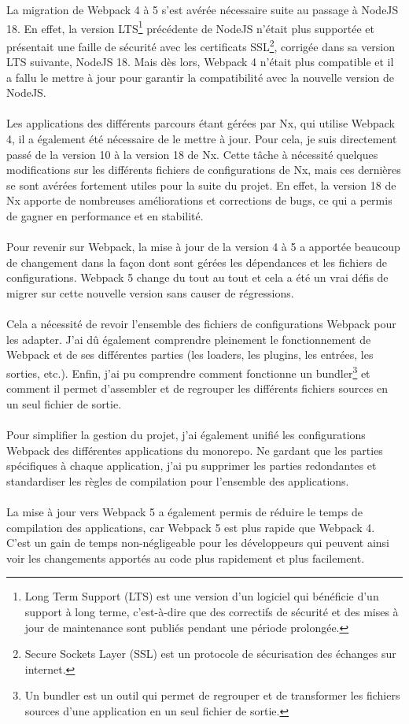 \documentclass[12pt, a4paper]{report}
\begin{document}
	La migration de Webpack 4 à 5 s'est avérée nécessaire suite au passage à NodeJS 18. En effet, la version LTS\footnote{Long Term Support (LTS) est une version d'un logiciel qui bénéficie d'un support à long terme, c'est-à-dire que des correctifs de sécurité et des mises à jour de maintenance sont publiés pendant une période prolongée.} précédente de NodeJS n'était plus supportée et présentait une faille de sécurité avec les certificats SSL\footnote{Secure Sockets Layer (SSL) est un protocole de sécurisation des échanges sur internet.}, corrigée dans sa version LTS suivante, NodeJS 18. Mais dès lors, Webpack 4 n'était plus compatible et il a fallu le mettre à jour pour garantir la compatibilité avec la nouvelle version de NodeJS.
	\\\\
	Les applications des différents parcours étant gérées par Nx, qui utilise Webpack 4, il a également été nécessaire de le mettre à jour. Pour cela, je suis directement passé de la version 10 à la version 18 de Nx. Cette tâche à nécessité quelques modifications sur les différents fichiers de configurations de Nx, mais ces dernières se sont avérées fortement utiles pour la suite du projet. En effet, la version 18 de Nx apporte de nombreuses améliorations et corrections de bugs, ce qui a permis de gagner en performance et en stabilité.
	\\\\
	Pour revenir sur Webpack, la mise à jour de la version 4 à 5 a apportée beaucoup de changement dans la façon dont sont gérées les dépendances et les fichiers de configurations. Webpack 5 change du tout au tout et cela a été un vrai défis de migrer sur cette nouvelle version sans causer de régressions. 
	\\\\
	Cela a nécessité de revoir l'ensemble des fichiers de configurations Webpack pour les adapter. J'ai dû également comprendre pleinement le fonctionnement de Webpack et de ses différentes parties (les loaders, les plugins, les entrées, les sorties, etc.). Enfin, j'ai pu comprendre comment fonctionne un bundler\footnote{Un bundler est un outil qui permet de regrouper et de transformer les fichiers sources d'une application en un seul fichier de sortie.} et comment il permet d'assembler et de regrouper les différents fichiers sources en un seul fichier de sortie.
	\\\\
	Pour simplifier la gestion du projet, j'ai également unifié les configurations Webpack des différentes applications du monorepo. Ne gardant que les parties spécifiques à chaque application, j'ai pu supprimer les parties redondantes et standardiser les règles de compilation pour l'ensemble des applications.
	\\\\
	La mise à jour vers Webpack 5 a également permis de réduire le temps de compilation des applications, car Webpack 5 est plus rapide que Webpack 4. C'est un gain de temps non-négligeable pour les développeurs qui peuvent ainsi voir les changements apportés au code plus rapidement et plus facilement.
\end{document}
